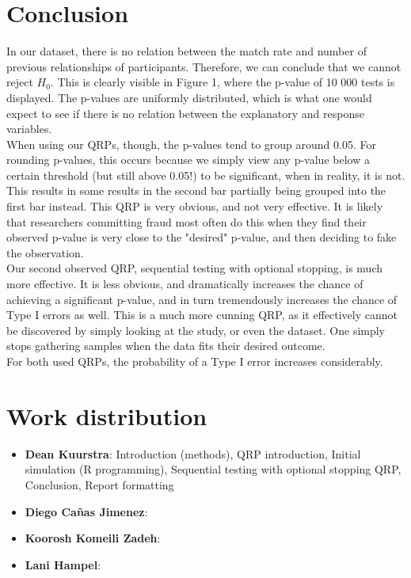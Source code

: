 \documentclass[12pt]{article}
\begin{document}
\section{Conclusion}
    In our dataset, there is no relation between the match rate and number of previous relationships of participants. Therefore, we can conclude that we cannot reject $H_0$. This is clearly visible in Figure 1, where the p-value of 10 000 tests is displayed. The p-values are uniformly distributed, which is what one would expect to see if there is no relation between the explanatory and response variables. \\
    When using our QRPs, though, the p-values tend to group around 0.05. For rounding p-values, this occurs because we simply view any p-value below a certain threshold (but still above 0.05!) to be significant, when in reality, it is not. This results in some results in the second bar partially being grouped into the first bar instead. This QRP is very obvious, and not very effective. It is likely that researchers committing fraud most often do this when they find their observed p-value is very close to the "desired" p-value, and then deciding to fake the observation. \\
    Our second observed QRP, sequential testing with optional stopping, is much more effective. It is less obvious, and dramatically increases the chance of achieving a significant p-value, and in turn tremendously increases the chance of Type I errors as well. This is a much more cunning QRP, as it effectively cannot be discovered by simply looking at the study, or even the dataset. One simply stops gathering samples when the data fits their desired outcome. \\
    For both used QRPs, the probability of a Type I error increases considerably.

\section{Work distribution}
    \begin{itemize}
        \item[] \textbf{Dean Kuurstra}: Introduction (methods), QRP introduction, Initial simulation (R programming), Sequential testing with optional stopping QRP, Conclusion, Report formatting
        \item[] \textbf{Diego Cañas Jimenez}:
        \item[] \textbf{Koorosh Komeili Zadeh}:
        \item[] \textbf{Lani Hampel}:
        \\
    \end{itemize}

 

\end{document}
